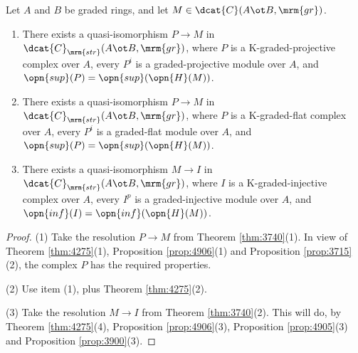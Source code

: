 \begin{cor} \label{cor:3830}
Let $A$ and $B$ be graded rings, and let 
$M \in \dcat{C}(A \ot B, \mrm{gr})$.
\begin{enumerate}
\item There exists a quasi-isomorphism 
$P \to M$ in $\dcat{C}_{\mrm{str}}(A \ot B, \mrm{gr})$,
where $P$ is a K-graded-projective complex over $A$, 
every $P^i$ is a graded-projective module over $A$, and
$\opn{sup}(P) = \opn{sup}(\opn{H}(M))$. 

\item There exists a quasi-isomorphism 
$P \to M$ in $\dcat{C}_{\mrm{str}}(A \ot B, \mrm{gr})$,
where $P$ is a K-graded-flat complex over $A$, 
every $P^i$ is a graded-flat module over $A$, and
$\opn{sup}(P) = \opn{sup}(\opn{H}(M))$. 

\item There exists a quasi-isomorphism 
$M \to I$ in $\dcat{C}_{\mrm{str}}(A \ot B, \mrm{gr})$,
where $I$ is a K-graded-injective complex over $A$, 
every $I^p$ is a graded-injective module over $A$, and
$\opn{inf}(I) = \opn{inf}(\opn{H}(M))$. 
\end{enumerate}
\end{cor}

\begin{proof} \mbox{}

\smallskip \noindent
(1) Take the resolution $P \to M$ from Theorem \ref{thm:3740}(1). 
In view of Theorem \ref{thm:4275}(1), Proposition \ref{prop:4906}(1) 
and Proposition \ref{prop:3715}(2),
the complex $P$ has the required properties. 

\medskip \noindent
(2) Use item (1), plus Theorem \ref{thm:4275}(2). 

\medskip \noindent
(3) Take the resolution $M \to I$ from Theorem \ref{thm:3740}(2).
This will do, by Theorem \ref{thm:4275}(4), Proposition \ref{prop:4906}(3), 
Proposition \ref{prop:4905}(3) and Proposition \ref{prop:3900}(3).
\end{proof}

